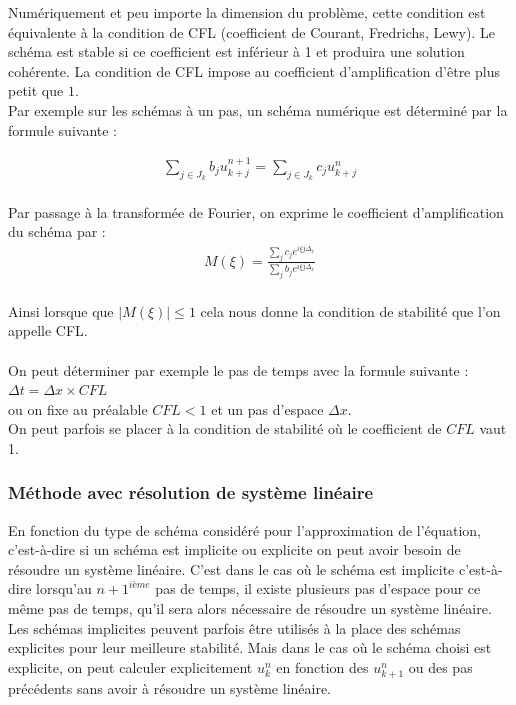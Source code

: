 \documentclass[12pt]{article}
\begin{document}
\noindent Numériquement et peu importe la dimension du problème, cette condition est équivalente à la condition de CFL (coefficient de Courant, Fredrichs, Lewy).
Le schéma est stable si ce coefficient est inférieur à 1 et produira une solution cohérente. 
La condition de CFL impose au coefficient d'amplification d'être plus petit que $1$.
\\Par exemple sur les schémas à un pas, un schéma numérique est déterminé par la formule suivante :

\begin{eqnarray*}
    \sum_{j\in J_k} b_ju_{k+j}^{n+1} = \sum_{j\in J_k} c_ju_{k+j}^{n} 
\end{eqnarray*}
\\Par passage à la transformée de Fourier, on exprime le coefficient d'amplification du schéma par :
\begin{eqnarray*}
     M(\xi)=\frac{\sum_j c_j e^{i\xi j \Delta_x}}{\sum_j b_j e^{i \xi j\Delta_x }}
\end{eqnarray*}
\\Ainsi lorsque que $|M(\xi)|\leq 1$ cela nous donne la condition de stabilité que l'on appelle CFL.
\\
\\
On peut déterminer par exemple le pas de temps avec la formule suivante :
$\Delta t = \Delta x \times CFL$
\\ou on fixe au préalable $CFL<1$ et un pas d'espace $\Delta x$.
\\On peut parfois se placer à la condition de stabilité où le coefficient de $CFL$ vaut 1.
\\
\subsubsection{Méthode avec résolution de système linéaire}\noindent En fonction du type de schéma considéré pour l'approximation de l'équation,  c'est-à-dire si un schéma est implicite ou explicite on peut avoir besoin de résoudre un système linéaire. C'est dans le cas où le schéma est implicite c'est-à-dire lorsqu'au $n+1^{ième}$ pas de temps, il existe plusieurs pas d'espace pour ce même pas de temps, qu'il sera alors nécessaire de résoudre un système linéaire.
Les schémas implicites peuvent parfois être utilisés à la place des schémas explicites pour leur meilleure stabilité. 
Mais dans le cas où le schéma choisi est explicite, on peut calculer explicitement $u_k^n$ en fonction des $u_{k+1}^{n}$ ou des pas précédents sans avoir à résoudre un système linéaire.
\end{document}
